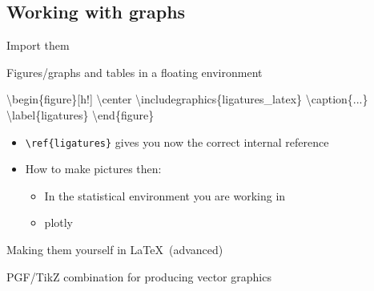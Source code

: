 \documentclass[ignorenonframetext,]{beamer}
\newenvironment{Shaded}{\begin{snugshade}}{\end{snugshade}}
\newcommand{\CommentTok}[1]{\textcolor[rgb]{0.56,0.35,0.01}{\textit{{#1}}}}
\newcommand{\NormalTok}[1]{{#1}}
\begin{document}
\subsection{Working with graphs}
\begin{frame}[fragile]{Import them}

Figures/graphs and tables in a floating environment

\begin{Shaded}
\begin{Highlighting}[]
\NormalTok{\textbackslash{}begin\{figure\}[h!] }
    \NormalTok{\textbackslash{}center }
        \NormalTok{\textbackslash{}includegraphics\{ligatures_latex\} }
    \NormalTok{\textbackslash{}caption\{...\} }
    \NormalTok{\textbackslash{}label\{ligatures\}}
\NormalTok{\textbackslash{}end\{figure\}}
\end{Highlighting}
\end{Shaded}

\begin{itemize}
\itemsep1pt\parskip0pt
\item
  \texttt{\textbackslash{}ref\{ligatures\}} gives you now the correct
  internal reference
\item
  How to make pictures then:

  \begin{itemize}
  \itemsep1pt\parskip0pt
  \item
    In the statistical environment you are working in
  \item
    plotly
  \end{itemize}
\end{itemize}

\end{frame}

\begin{frame}[fragile]{Making them yourself in \LaTeX~(advanced)}

PGF/TikZ combination for producing vector graphics

\begin{Shaded}
\end{Shaded}

\end{frame}
\end{document}

